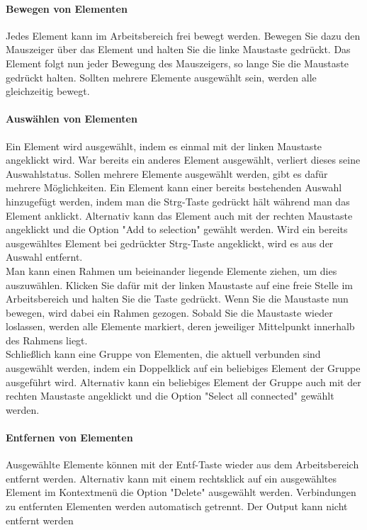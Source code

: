 \paragraph{Bewegen von Elementen}
Jedes Element kann im Arbeitsbereich frei bewegt werden. Bewegen Sie dazu den Mauszeiger \"uber das Element und halten Sie die linke Maustaste gedr\"uckt. Das Element folgt nun jeder Bewegung des Mauszeigers, so lange Sie die Maustaste gedr\"uckt halten. Sollten mehrere Elemente ausgew\"ahlt sein, werden alle gleichzeitig bewegt.

\paragraph{Ausw\"ahlen von Elementen}
Ein Element wird ausgew\"ahlt, indem es einmal mit der linken Maustaste angeklickt wird. War bereits ein anderes Element ausgew\"ahlt, verliert dieses seine Auswahlstatus. Sollen mehrere Elemente ausgew\"ahlt werden, gibt es daf\"ur mehrere M\"oglichkeiten. Ein Element kann einer bereits bestehenden Auswahl hinzugef\"ugt werden, indem man die Strg-Taste gedr\"uckt h\"alt w\"ahrend man das Element anklickt. Alternativ kann das Element auch mit der rechten Maustaste angeklickt und die Option "Add to selection" gew\"ahlt werden. Wird ein bereits ausgew\"ahltes Element bei gedr\"uckter Strg-Taste angeklickt, wird es aus der Auswahl entfernt. 
\\
Man kann einen Rahmen um beieinander liegende Elemente ziehen, um dies auszuw\"ahlen. Klicken Sie daf\"ur mit der linken Maustaste auf eine freie Stelle im Arbeitsbereich und halten Sie die Taste gedr\"uckt. Wenn Sie die Maustaste nun bewegen, wird dabei ein Rahmen gezogen. Sobald Sie die Maustaste wieder loslassen, werden alle Elemente markiert, deren jeweiliger Mittelpunkt innerhalb des Rahmens liegt.
\\
Schlie{\ss}lich kann eine Gruppe von Elementen, die aktuell verbunden sind ausgew\"ahlt werden, indem ein Doppelklick auf ein beliebiges Element der Gruppe ausgef\"uhrt wird. Alternativ kann ein beliebiges Element der Gruppe auch mit der rechten Maustaste angeklickt und die Option "Select all connected" gew\"ahlt werden.

\paragraph{Entfernen von Elementen}
Ausgew\"ahlte Elemente k\"onnen mit der Entf-Taste wieder aus dem Arbeitsbereich entfernt werden. Alternativ kann mit einem rechtsklick auf ein ausgew\"ahltes Element im Kontextmen\"u die Option "Delete" ausgew\"ahlt werden. Verbindungen zu entfernten Elementen werden automatisch getrennt. Der Output kann nicht entfernt werden

